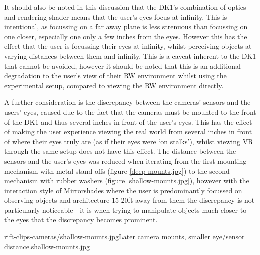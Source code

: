 It should also be noted in this discussion that the DK1's combination of optics and rendering shader means that the user's eyes focus at infinity. This is intentional, as focussing on a far away plane is less strenuous than focussing on one closer, especially one only a few inches from the eyes. However this has the effect that the user is focussing their eyes at infinity, whilst perceiving objects at varying distances between them and infinity. This is a caveat inherent to the DK1 that cannot be avoided, however it should be noted that this is an additional degradation to the user's view of their RW environment whilst using the experimental setup, compared to viewing the RW environment directly.

A further consideration is the discrepancy between the cameras' sensors and the users' eyes, caused due to the fact that the cameras must be mounted to the front of the DK1 and thus several inches in front of the user's eyes. This has the effect of making the user experience viewing the real world from several inches in front of where their eyes truly are (as if their eyes were `on stalks'), whilst viewing VR through the same setup does not have this effect. The distance between the sensors and the user's eyes was reduced when iterating from the first mounting mechanism with metal stand-offs (figure \ref{deep-mounts.jpg}) to the second mechanism with rubber washers (figure \ref{shallow-mounts.jpg}), however with the interaction style of Mirrorshades where the user is predominantly focussed on observing objects and architecture 15-20ft away from them the discrepancy is not particularly noticeable - it is when trying to manipulate objects much closer to the eyes that the discrepancy becomes prominent.

       {rift-clips-cameras/shallow-mounts.jpg}{Later camera mounts, smaller eye/sensor distance.}{shallow-mounts.jpg}




